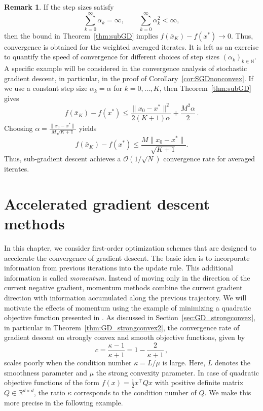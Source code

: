 \documentclass[12pt,openany]{book}
\theoremstyle{definition}
\newtheorem{remark}[thm]{Remark}
\theoremstyle{definition}
\newcommand{\N}{\mathbb{N}}
\newcommand{\R}{\mathbb{R}}
\begin{document}
\begin{remark}
If the step sizes satisfy
\[
\sum_{k=0}^{\infty}\alpha_k=\infty,
\qquad
\sum_{k=0}^{\infty}\alpha_k^2<\infty,
\]
then the bound in Theorem~\ref{thm:subGD} implies $f(\bar x_K)-f(x^\ast)\to 0$. Thus, convergence is obtained for the weighted averaged iterates. It is left as an exercise to quantify the speed of convergence for different choices of step sizes $(\alpha_k)_{k\in\N}$. A specific example will be considered in the convergence analysis of stochastic gradient descent, in particular, in the proof of Corollary~\ref{cor:SGDnonconvex}. If we use a constant step size $\alpha_k=\alpha$ for $k=0,\dots,K$, then Theorem~\ref{thm:subGD} gives
\[
f(\bar x_K)-f(x^\ast)
\leq
\frac{\|x_0-x^\ast\|^2}{2(K+1)\alpha}
+\frac{M^2\alpha}{2}\,.
\]
Choosing $\alpha=\frac{\|x_0-x^\ast\|}{M\sqrt{K+1}}$
yields
\[
f(\bar x_K)-f(x^\ast)
\leq
\frac{M\|x_0-x^\ast\|}{\sqrt{K+1}}.
\]
Thus, sub-gradient descent achieves a $\mathcal O(1/\sqrt{N})$ convergence rate for averaged iterates.
\end{remark}

\chapter{Accelerated gradient descent methods } \label{ch:accmethods}
In this chapter, we consider first-order optimization schemes that are designed to accelerate the
convergence of gradient descent. The basic idea is to incorporate information from previous
iterations into the update rule. This additional information is called \textit{momentum}. Instead
of moving only in the direction of the current negative gradient, momentum methods combine the
current gradient direction with information accumulated along the previous trajectory. We will motivate the effects of momentum using the example of minimizing a quadratic objective function presented in \cite{QIAN1999145}. As discussed in Section~\ref{sec:GD_strongconvex}, in particular in Theorem~\ref{thm:GD_strongconvex2},  the convergence rate of gradient descent on strongly convex and smooth objective functions, given by
\[c = \frac{\kappa-1}{\kappa+1} = 1-\frac{2}{\kappa+1}\,,\]
scales poorly when the condition number $\kappa = L/\mu$ is large. Here, $L$ denotes the smoothness parameter and $\mu$ the strong convexity parameter. In case of quadratic objective functions of the form $f(x) = \frac12x^\top Q x$ with positive definite matrix $Q\in\R^{d\times d}$, the ratio $\kappa$ corresponds to the condition number of $Q$. We make this more precise in the following example.
\end{document}

